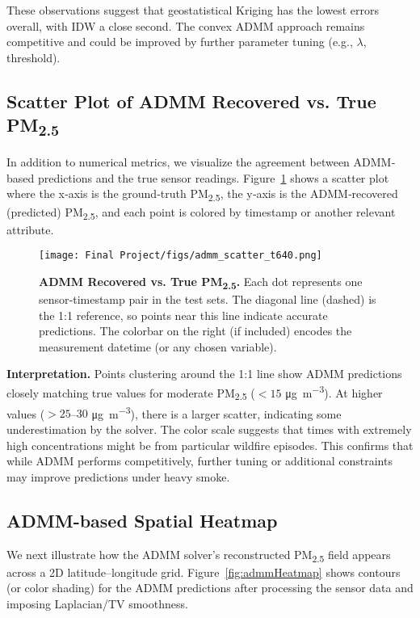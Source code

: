 \documentclass[12pt]{article}                                %
\begin{document}
These observations suggest that geostatistical Kriging has the lowest errors overall, with 
IDW a close second. The convex ADMM approach remains competitive and could be improved by 
further parameter tuning (e.g., $\lambda$, threshold). 

\subsection{Scatter Plot of ADMM Recovered vs. True PM\texorpdfstring{\textsubscript{2.5}}{}}

In addition to numerical metrics, we visualize the agreement between ADMM‐based predictions and the true sensor readings. Figure~\ref{fig:admmScatter} shows a scatter plot where the x‐axis is the ground‐truth PM\textsubscript{2.5}, the y‐axis is the ADMM‐recovered (predicted) PM\textsubscript{2.5}, and each point is colored by timestamp or another relevant attribute.

\begin{figure}[H]  %
    \centering
    \texttt{[image: Final Project/figs/admm\_scatter\_t640.png]}
    \caption{\textbf{ADMM Recovered vs. True PM\textsubscript{2.5}.} 
    Each dot represents one sensor‐timestamp pair in the test sets. The diagonal line (dashed) is the 1:1 reference, so points near this line indicate accurate predictions. The colorbar on the right (if included) encodes the measurement datetime (or any chosen variable).}
    \label{fig:admmScatter}
\end{figure}

\noindent
\textbf{Interpretation.}
Points clustering around the 1:1 line show ADMM predictions closely matching true values for moderate PM\textsubscript{2.5} (\(<15\) \si{\micro\gram\per\cubic\meter}). 
At higher values (\(>25\)--\(30\) \si{\micro\gram\per\cubic\meter}), there is a larger scatter, indicating some underestimation by the solver. The color scale suggests that times with extremely high concentrations might be from particular wildfire episodes. This confirms that while ADMM performs competitively, further tuning or additional constraints may improve predictions under heavy smoke.

\subsection{ADMM-based Spatial Heatmap}

We next illustrate how the ADMM solver’s reconstructed PM\textsubscript{2.5} field appears across a 2D latitude–longitude grid. 
Figure~\ref{fig:admmHeatmap} shows contours (or color shading) for the ADMM predictions after processing the sensor data and imposing Laplacian/TV smoothness.
\end{document}
